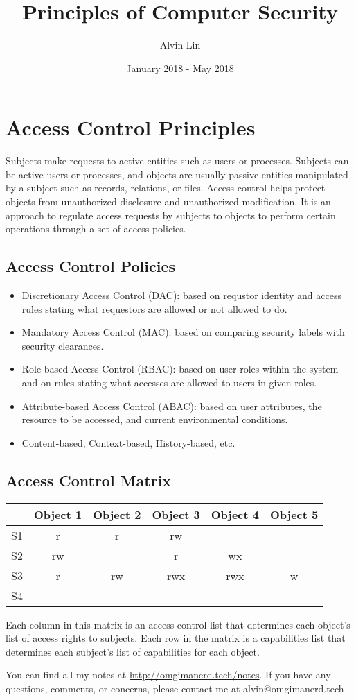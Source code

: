 \documentclass{math}
\title{Principles of Computer Security}
\author{Alvin Lin}
\date{January 2018 - May 2018}
\begin{document}
\maketitle

\section*{Access Control Principles}
Subjects make requests to active entities such as users or processes. Subjects
can be active users or processes, and objects are usually passive entities
manipulated by a subject such as records, relations, or files. Access control
helps protect objects from unauthorized disclosure and unauthorized
modification. It is an approach to regulate access requests by subjects to
objects to perform certain operations through a set of access policies.

\subsection*{Access Control Policies}
\begin{itemize}
  \item Discretionary Access Control (DAC): based on requstor identity and
  access rules stating what requestors are allowed or not allowed to do.
  \item Mandatory Access Control (MAC): based on comparing security labels
  with security clearances.
  \item Role-based Access Control (RBAC): based on user roles within the system
  and on rules stating what accesses are allowed to users in given roles.
  \item Attribute-based Access Control (ABAC): based on user attributes, the
  resource to be accessed, and current environmental conditions.
  \item Content-based, Context-based, History-based, etc.
\end{itemize}

\subsection*{Access Control Matrix}
\begin{center}
  \begin{tabular}{|c|c|c|c|c|c|}
    \hline
    & Object 1 & Object 2 & Object 3 & Object 4 & Object 5 \\
    \hline
    S1 & r & r & rw & & \\
    \hline
    S2 & rw & & r & wx & \\
    \hline
    S3 & r & rw & rwx & rwx & w \\
    \hline
    S4 & & & & & \\
    \hline
  \end{tabular}
\end{center}
Each column in this matrix is an access control list that determines each
object's list of access rights to subjects. Each row in the matrix is a
capabilities list that determines each subject's list of capabilities for each
object.

\begin{center}
  You can find all my notes at \url{http://omgimanerd.tech/notes}. If you have
  any questions, comments, or concerns, please contact me at
  alvin@omgimanerd.tech
\end{center}
\end{document}
